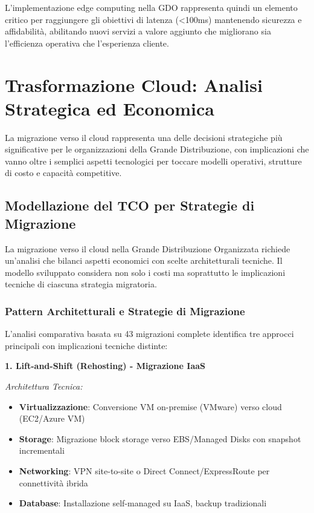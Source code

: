L'implementazione edge computing nella GDO rappresenta quindi un elemento critico per raggiungere gli obiettivi di latenza (<100ms) mantenendo sicurezza e affidabilità, abilitando nuovi servizi a valore aggiunto che migliorano sia l'efficienza operativa che l'esperienza cliente.
\section{\texorpdfstring{\textbf{Trasformazione Cloud: Analisi Strategica ed Economica}}{3.4 - Trasformazione Cloud: Analisi Strategica ed Economica}}

La migrazione verso il cloud rappresenta una delle decisioni strategiche più significative per le organizzazioni della Grande Distribuzione, con implicazioni che vanno oltre i semplici aspetti tecnologici per toccare modelli operativi, strutture di costo e capacità competitive.

\subsection{\texorpdfstring{\textbf{Modellazione del TCO per Strategie di Migrazione}}{3.4.1 - Modellazione del TCO per Strategie di Migrazione}}

La migrazione verso il cloud nella Grande Distribuzione Organizzata richiede un'analisi che bilanci aspetti economici con scelte architetturali tecniche. Il modello sviluppato\autocite{KhajehHosseini2024} considera non solo i costi ma soprattutto le implicazioni tecniche di ciascuna strategia migratoria.

\subsubsection{\texorpdfstring{\textbf{Pattern Architetturali e Strategie di Migrazione}}{3.4.1.1 - Pattern Architetturali e Strategie di Migrazione}}

L'analisi comparativa basata su 43 migrazioni complete\autocite{McKinsey2024cloud} identifica tre approcci principali con implicazioni tecniche distinte:

\textbf{1. Lift-and-Shift (Rehosting) - Migrazione IaaS}

\textit{Architettura Tecnica:}
\begin{itemize}
    \item \textbf{Virtualizzazione}: Conversione VM on-premise (VMware) verso cloud (EC2/Azure VM)
    \item \textbf{Storage}: Migrazione block storage verso EBS/Managed Disks con snapshot incrementali
    \item \textbf{Networking}: VPN site-to-site o Direct Connect/ExpressRoute per connettività ibrida
    \item \textbf{Database}: Installazione self-managed su IaaS, backup tradizionali
\end{itemize}

